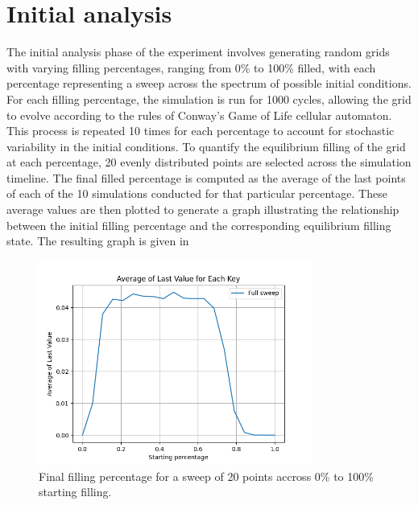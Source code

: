 \documentclass{article}
\begin{document}
\section{Initial analysis}
The initial analysis phase of the experiment involves generating random 
grids with varying filling percentages, ranging from 0\% to 100\% filled, 
with each percentage representing a sweep across the spectrum of possible 
initial conditions. For each filling percentage, the simulation is run for 
1000 cycles, allowing the grid to evolve according to the rules of Conway's 
Game of Life cellular automaton. This process is repeated 10 times for 
each percentage to account for stochastic variability in the initial conditions. 
To quantify the equilibrium filling of the grid at each percentage, 20 evenly 
distributed points are selected across the simulation timeline. The final 
filled percentage is computed as the average of the last points of each of the 
10 simulations conducted for that particular percentage. These average values 
are then plotted to generate a graph illustrating the relationship between the 
initial filling percentage and the corresponding equilibrium filling state. The resulting 
graph is given in 

\begin{figure}[htbp]
    \centering
    \includegraphics[width=0.8\textwidth]{res/full_start_finish.png}
    \caption{Final filling percentage for a sweep of 20 points accross 0\% to 100\% starting filling.}
    \label{fig:full}
\end{figure}
\end{document}
